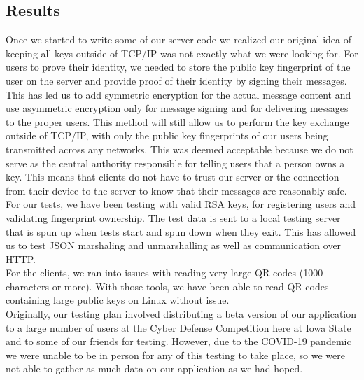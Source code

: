 \documentclass[11pt]{article}
\begin{document}
\subsection{Results}

Once we started to write some of our server code we realized our original idea of keeping all keys outside of TCP/IP was not exactly what we were looking for. For users to prove their identity, we needed to store the public key fingerprint of the user on the server and provide proof of their identity by signing their messages. This has led us to add symmetric encryption for the actual message content and use asymmetric encryption only for message signing and for delivering messages to the proper users. This method will still allow us to perform the key exchange outside of TCP/IP, with only the public key fingerprints of our users being transmitted across any networks. This was deemed acceptable because we do not serve as the central authority responsible for telling users that a person owns a key. This means that clients do not have to trust our server or the connection from their device to the server to know that their messages are reasonably safe.\\

For our tests, we have been testing with valid RSA keys, for registering users and validating fingerprint ownership. The test data is sent to a local testing server that is spun up when tests start and spun down when they exit. This has allowed us to test JSON marshaling and unmarshalling as well as communication over HTTP.\\


For the clients, we ran into issues with reading very large QR codes (1000 characters or more). With those tools, we have been able to read QR codes containing large public keys on Linux without issue. \\

Originally, our testing plan involved distributing a beta version of our application to a large number of users at the Cyber Defense Competition here at Iowa State and to some of our friends for testing. However, due to the COVID-19 pandemic we were unable to be in person for any of this testing to take place, so we were not able to gather as much data on our application as we had hoped. \\
\end{document}
